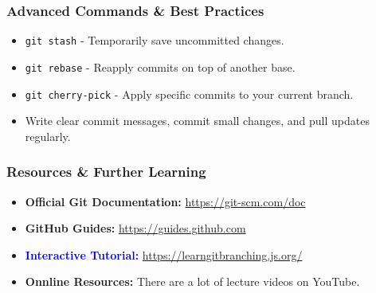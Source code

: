 \documentclass[10pt]{beamer}
\begin{document}
\begin{frame}
    \frametitle{Advanced Commands \& Best Practices}
    \begin{itemize}
        \item \texttt{git stash} - Temporarily save uncommitted changes.
        \item \texttt{git rebase} - Reapply commits on top of another base.
        \item \texttt{git cherry-pick} - Apply specific commits to your current branch.
        \item Write clear commit messages, commit small changes, and pull updates regularly.
    \end{itemize}
\end{frame}

\begin{frame}
    \frametitle{Resources \& Further Learning}
    \begin{itemize}
        \item \textbf{Official Git Documentation:} \url{https://git-scm.com/doc}
        \item \textbf{GitHub Guides:} \url{https://guides.github.com}
        \item \textcolor{blue}{\textbf{Interactive Tutorial:} \url{https://learngitbranching.js.org/}}
        \item \textbf{Onnline Resources:} There are a lot of lecture videos on YouTube.
    \end{itemize}
\end{frame}
\end{document}
